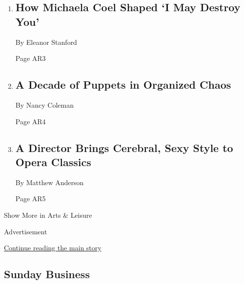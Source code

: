 \begin{enumerate}
\def\labelenumi{\arabic{enumi}.}
\item
  \href{/2020/07/20/arts/television/i-may-destroy-you-influences.html}{}

  \hypertarget{how-michaela-coel-shaped-i-may-destroy-you}{%
  \subsection{How Michaela Coel Shaped `I May Destroy
  You'}\label{how-michaela-coel-shaped-i-may-destroy-you}}

  By Eleanor Stanford

  Page AR3
\item
  \href{/2020/07/23/theater/manual-cinema-puppets-retrospective.html}{}

  \hypertarget{a-decade-of-puppets-in-organized-chaos}{%
  \subsection{A Decade of Puppets in Organized
  Chaos}\label{a-decade-of-puppets-in-organized-chaos}}

  By Nancy Coleman

  Page AR4
\item
  \href{/2020/07/22/arts/music/krzysztof-warlikowski.html}{}

  \hypertarget{a-director-brings-cerebral-sexy-style-to-opera-classics}{%
  \subsection{A Director Brings Cerebral, Sexy Style to Opera
  Classics}\label{a-director-brings-cerebral-sexy-style-to-opera-classics}}

  By Matthew Anderson

  Page AR5
\end{enumerate}

Show More in Arts \& Leisure

Advertisement

\protect\hyperlink{after-mid4}{Continue reading the main story}

\hypertarget{sunday-business}{%
\subsection{Sunday Business}\label{sunday-business}}

